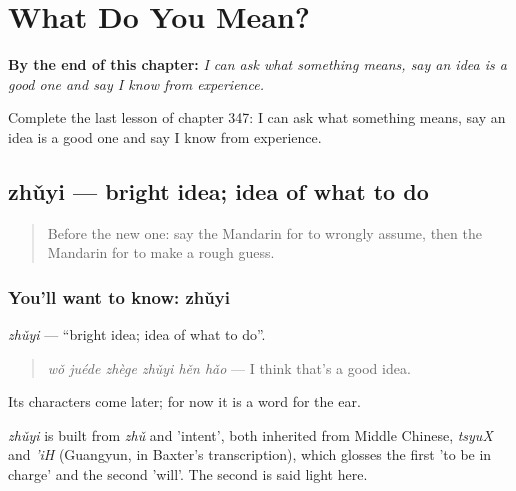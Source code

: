 
\chapter{What Do You Mean?}
\label{ch:zh-what-do-you-mean}

\begin{chapteropening}
\textbf{By the end of this chapter:} \emph{I can ask what something means, say an idea is a good one and say I know from experience.}

Complete the last lesson of chapter 347: I can ask what something means, say an idea is a good one and say I know from experience.
\end{chapteropening}

\section[zhǔyi]{zhǔyi — bright idea; idea of what to do}

\label{lesson:ZH-C347-zhuyi}



\begin{quote}
Before the new one: say the Mandarin for to wrongly assume, then the Mandarin for to make a rough guess.
\end{quote}

\subsection*{You'll want to know: zhǔyi}
\emph{zhǔyi} — \textquotedblleft{}bright idea; idea of what to do\textquotedblright{}.

\begin{quote}
\emph{wǒ juéde zhège zhǔyi hěn hǎo} — I think that's a good idea.
\end{quote}

Its characters come later; for now it is a word for the ear.

\begin{cousinweb}
\emph{zhǔyi} is built from \emph{zhǔ} and  'intent', both inherited from Middle Chinese, \emph{tsyuX} and \emph{'iH} (Guangyun, in Baxter's transcription), which glosses the first 'to be in charge' and the second 'will'. The second is said light here.
\end{cousinweb}

